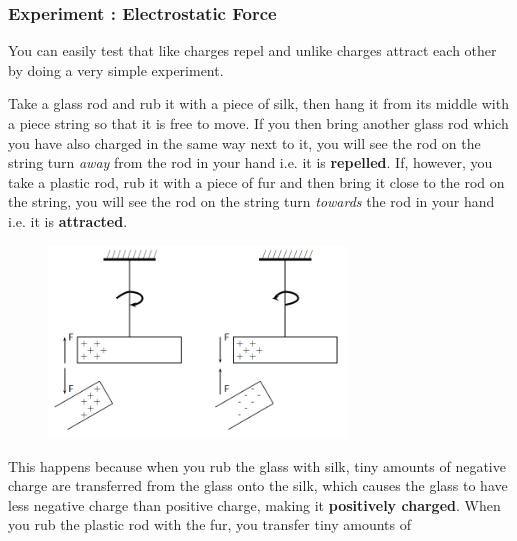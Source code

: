             \subsubsection{  Experiment : Electrostatic Force }
            \nopagebreak
      \label{m38780*id200937}You can easily test that
like charges repel and unlike charges attract each other by doing a very
simple experiment.\par 
      \label{m38780*id200944}Take a glass rod and rub it with a piece of silk, then hang it from its middle with a piece string so that it is free to move. If you then bring another glass rod which you
have also charged in the same way next to it, you will see the rod
on the string turn \textsl{away} from the rod in your hand i.e. it
is \textbf{repelled}. If, however, you take a plastic rod, rub it
with a piece of fur and then bring it close to the rod on the
string, you will see the rod on the string turn \textsl{towards} the
rod in your hand i.e. it is \textbf{attracted}.\par 
      \label{m38780*id200971}
    \setcounter{subfigure}{0}
	\begin{figure}[H] %
    \begin{center}
    \label{m38780*id200974!!!underscore!!!media}\label{m38780*id200974!!!underscore!!!printimage}\includegraphics[width=300px]{col11305.imgs/m38780_PG10C8_006.png} %
      \vspace{2pt}
    \vspace{.1in}
    \end{center}
 \end{figure}       
      \par 
      \label{m38780*id200980}This happens because when you rub the glass with silk,
tiny amounts of negative charge are transferred from the glass
onto the silk, which causes the glass to have less negative charge
than positive charge, making it \textbf{positively charged}. When
you rub the plastic rod with the fur, you transfer tiny amounts of
